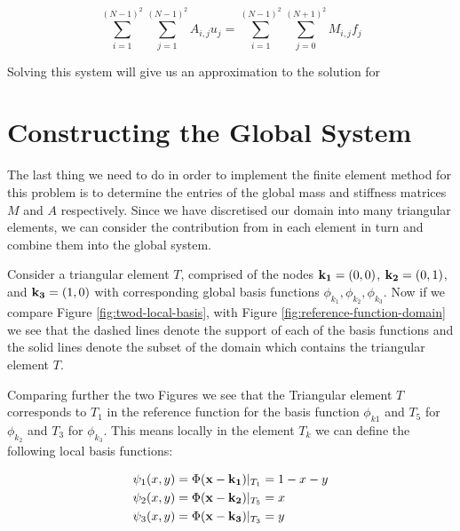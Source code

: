 \begin{equation}
    \sum_{i = 1}^{(N-1)^2}\sum_{j=1}^{(N-1)^2}A_{i,j}u_j =
    \sum_{i=1}^{(N-1)^2}\sum_{j=0}^{(N+1)^2}M_{i,j}f_j
\end{equation}

Solving this system will give us an approximation to the solution for

\section{Constructing the Global System}

The last thing we need to do in order to implement the finite element method
for this problem is to determine the entries of the global mass and stiffness
matrices $M$ and $A$ respectively. Since we have discretised our domain into
many triangular elements, we can consider the contribution from in each element
in turn and combine them into the global system.

Consider a triangular element $T$, comprised of the nodes $\mathbf{k_1} = (0,0)$,
$\mathbf{k_2} = (0,1)$, and $\mathbf{k_3} = (1,0)$ with corresponding global basis functions
$\phi_{k_1}, \phi_{k_2}, \phi_{k_3}$. Now if we compare Figure
\ref{fig:twod-local-basis}, with Figure \ref{fig:reference-function-domain}
we see that the dashed lines denote the support of each of the basis functions
and the solid lines denote the subset of the domain which contains the triangular
element $T$.

Comparing further the two Figures we see that the Triangular element $T$
corresponds to $T_1$ in the reference function for the basis function $\phi_{k1}$
and $T_5$ for $\phi_{k_2}$ and $T_3$ for $\phi_{k_3}$. This means locally in the
element $T_k$ we can define the following local basis functions:

\begin{align}\label{eq:twod-local-basis}
    \begin{split}
        \psi_1(x, y) = \Phi(\mathbf{x} - \mathbf{k_1})|_{T_1} &= 1 - x - y \\
        \psi_2(x, y) = \Phi(\mathbf{x} - \mathbf{k_2})|_{T_5} &= x \\
        \psi_3(x, y) = \Phi(\mathbf{x} - \mathbf{k_3})|_{T_3} &= y
    \end{split}
\end{align}

